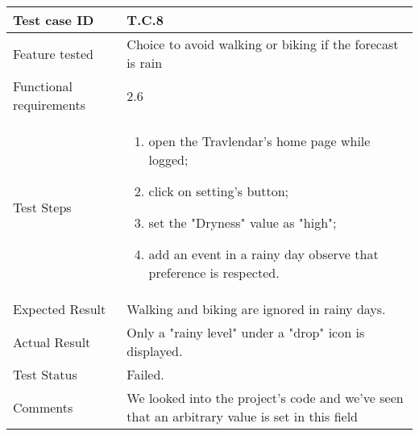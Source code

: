 \begin{table}[H]
	\begin{center}
		\begin{tabular}{ | p{} | p{} | }
		\hline
		Test case ID & T.C.8\\
		\hline
		Feature tested & Choice to avoid walking or biking if the forecast is rain\\
		\hline
		Functional requirements & 2.6  \\
		\hline
		Test Steps & 
			\begin{enumerate}
				\item open the Travlendar's home page while logged;
				\item click on setting's button;
				\item set the "Dryness" value as "high";
				\item  add an event in a rainy day observe that preference is respected.
			\end{enumerate} \\
		\hline
		Expected Result & Walking and biking are ignored in rainy days.\\
		\hline
		Actual Result & Only a "rainy level" under a "drop" icon is displayed.\\ 
		\hline
		Test Status & \color{Red}Failed.\\ 
		\hline
		Comments & We looked into the project's code and we've seen that an arbitrary value is set in this field \\ 
		\hline
		\end{tabular}
	\end{center}
\end{table}

